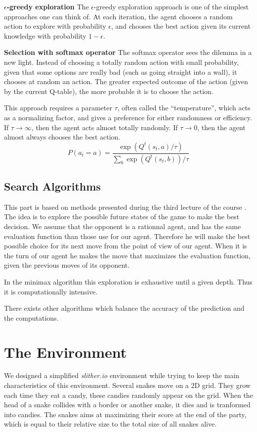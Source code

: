\documentclass[journal, a4paper]{IEEEtran}
\begin{document}
\textbf{$\epsilon$-greedy exploration}
The $\epsilon$-greedy exploration approach is one of the simplest approaches one can think of.
At each iteration, the agent chooses a random action to explore with probability $\epsilon$, and chooses the best action given its current knowledge with probability $1-\epsilon$.
\cite{lecture-rl}
\cite{lecture-rl2}
\cite{intro-rl}

\textbf{Selection with softmax operator}
The softmax operator sees the dilemma in a new light.
Instead of choosing a totally random action with small probability, given that some options are really bad (such as going straight into a wall), it chooses at random an action.
The greater expected outcome of the action (given by the current Q-table), the more probable it is to choose the action.

This approach requires a parameter $\tau$, often called the ``temperature'', which acts as a normalizing factor, and gives a preference for either randomness or efficiency.
If $\tau \to \infty$, then the agent acts almost totally randomly.
If $\tau \to 0$, then the agent almost always chooses the best action.
\cite{intro-rl}
\[
    P\left(a_t = a\right) = \frac{\exp\left(Q^t(s_t, a) / \tau\right)}{\sum\limits_b \exp\left(Q^t(s_t, b)\right) / \tau}
\]


\subsection{Search Algorithms}
This part is based on methods presented during the third lecture of the course \cite{lecture_minimax}. The idea is to explore the possible future states of the game to make the best decision. We assume that the opponent is a rationnal agent, and has the same evaluation function than those use for our agent. Therefore he will make the best possible choice for its next move from the point of view of our agent. When it is the turn of our agent he makes the move that maximizes the evaluation function, given the previous moves of its opponent.

In the minimax algorithm this exploration is exhaustive until a given depth. Thus it is computationally intensive.

There exists other algorithms which balance the accuracy of the prediction and the computations.

\section{The Environment}
We designed a simplified \emph{slither.io} environment while trying to keep the main characteristics of this environment. Several snakes move on a 2D grid. They grow each time they eat a candy, these candies randomly appear on the grid. When the head of a snake collides with a border or another snake, it dies and is tranformed into candies. The snakes aims at maximizing their score at the end of the party, which is equal to their relative size to the total size of all snakes alive.
\end{document}
